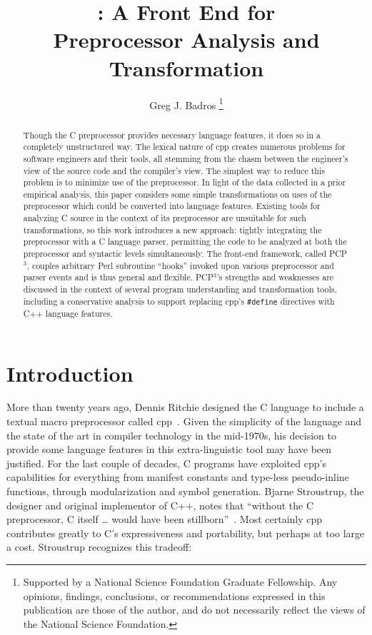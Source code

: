 \documentclass{article}
\title{\pcp{}: A \C{} Front End for \\ Preprocessor Analysis and Transformation}
\author{Greg J. Badros%
  \thanks{Supported by a National Science Foundation
    Graduate Fellowship. Any opinions, findings, conclusions, or
    recommendations expressed in this publication are those of the
    author, and do not necessarily reflect the views of the National
    Science Foundation.}
  }
\newcommand{\pcp}{\mbox{\textsf{PCP}$^3$}}
\newcommand{\Cpp}{\mbox{\textsf{cpp}}}
\newcommand{\CPP}{\mbox{\textsf{C++}}}
\newcommand{\Perl}{\mbox{\textsf{Perl}}}
\newcommand{\C}{\mbox{\textsf{C}}}
\newcommand{\ppd}[1]{\texttt{\##1}}
\begin{document}
\maketitle

\begin{abstract}
\label{sec:abstract}
Though the \C{} preprocessor provides necessary language features, it
does so in a completely unstructured way.  The lexical nature of \Cpp{}
creates numerous problems for software engineers and their tools, all
stemming from the chasm between the engineer's view of the source code
and the compiler's view.  The simplest way to reduce this problem is to
minimize use of the preprocessor.  In light of the data collected in a
prior empirical analysis, this paper considers some simple
transformations on uses of the preprocessor which could be converted
into language features. Existing tools for analyzing \C{} source in the
context of its preprocessor are unsuitable for such transformations, so
this work introduces a new approach: tightly integrating the
preprocessor with a \C{} language parser, permitting the code to be
analyzed at both the preprocessor and syntactic levels simultaneously.
The front-end framework, called \pcp{}, couples arbitrary \Perl{}
subroutine ``hooks'' invoked upon various preprocessor and parser events
and is thus general and flexible. \pcp{}'s strengths and weaknesses are
discussed in the context of several program understanding and
transformation tools, including a conservative analysis to support
replacing \Cpp{}'s \ppd{define} directives with \CPP{} language
features.

\end{abstract}
\bigskip

\section{Introduction}
\label{sec:intro}
More than twenty years ago, Dennis Ritchie designed the \C{} language to
include a textual macro preprocessor called
\Cpp{}~\cite[Ch.~3]{Harbison91}.  Given the simplicity of the language
and the state of the art in compiler technology in the mid-1970s, his
decision to provide some language features in this extra-linguistic tool
may have been justified.  For the last couple of decades, \C{} programs
have exploited \Cpp{}'s capabilities for everything from manifest
constants and type-less pseudo-inline functions, through modularization
and symbol generation.  Bjarne Stroustrup, the designer and original
implementor of \CPP{}, notes that ``without the \C{} preprocessor, \C{}
itself \ldots{} would have been stillborn''~\cite[p.~119]{Stroustrup94}.
Most certainly \Cpp{} contributes greatly to \C{}'s expressiveness and
portability, but perhaps at too large a cost.  Stroustrup recognizes
this tradeoff:
\end{document}
